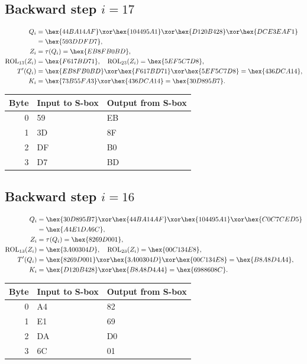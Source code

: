 \subsection*{Backward step $i=17$}
\begin{align*}
Q_i&=\hex{44BA14AF}\xor\hex{104495A1}\xor\hex{D120B428}\xor\hex{DCE3EAF1}\\&=\hex{593DDFD7},\\
Z_i&=\tau(Q_i)=\hex{EB8FB0BD},\\
\operatorname{ROL}_{13}(Z_i)&=\hex{F617BD71},\quad\operatorname{ROL}_{23}(Z_i)=\hex{5EF5C7D8},\\
T'(Q_i)&=\hex{EB8FB0BD}\xor\hex{F617BD71}\xor\hex{5EF5C7D8}=\hex{436DCA14},\\
K_i&=\hex{73B55FA3}\xor\hex{436DCA14}=\hex{30D895B7}.\end{align*}
\begingroup\small
\begin{longtable}{rll}
\toprule
Byte & Input to S-box & Output from S-box\\\midrule
\endhead
0 & 59 & EB\\
1 & 3D & 8F\\
2 & DF & B0\\
3 & D7 & BD\\
\bottomrule\end{longtable}
\endgroup
\subsection*{Backward step $i=16$}
\begin{align*}
Q_i&=\hex{30D895B7}\xor\hex{44BA14AF}\xor\hex{104495A1}\xor\hex{C0C7CED5}\\&=\hex{A4E1DA6C},\\
Z_i&=\tau(Q_i)=\hex{8269D001},\\
\operatorname{ROL}_{13}(Z_i)&=\hex{3A00304D},\quad\operatorname{ROL}_{23}(Z_i)=\hex{00C134E8},\\
T'(Q_i)&=\hex{8269D001}\xor\hex{3A00304D}\xor\hex{00C134E8}=\hex{B8A8D4A4},\\
K_i&=\hex{D120B428}\xor\hex{B8A8D4A4}=\hex{6988608C}.\end{align*}
\begingroup\small
\begin{longtable}{rll}
\toprule
Byte & Input to S-box & Output from S-box\\\midrule
\endhead
0 & A4 & 82\\
1 & E1 & 69\\
2 & DA & D0\\
3 & 6C & 01\\
\bottomrule\end{longtable}
\endgroup
